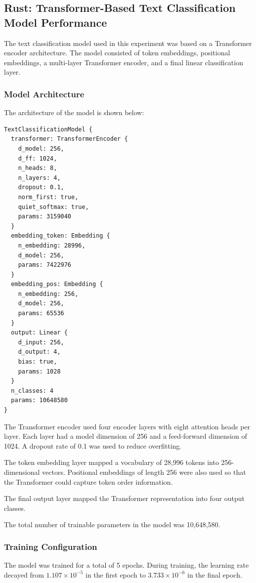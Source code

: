 \documentclass{ieeeaccess}
\begin{document}
\subsection{Rust: Transformer-Based Text Classification Model Performance}

The text classification model used in this experiment was based on a Transformer encoder architecture. The model consisted of token embeddings, positional embeddings, a multi-layer Transformer encoder, and a final linear classification layer.

\subsubsection{Model Architecture}

The architecture of the model is shown below:

\begin{lstlisting}
TextClassificationModel {
  transformer: TransformerEncoder {
    d_model: 256,
    d_ff: 1024,
    n_heads: 8,
    n_layers: 4,
    dropout: 0.1,
    norm_first: true,
    quiet_softmax: true,
    params: 3159040
  }
  embedding_token: Embedding {
    n_embedding: 28996,
    d_model: 256,
    params: 7422976
  }
  embedding_pos: Embedding {
    n_embedding: 256,
    d_model: 256,
    params: 65536
  }
  output: Linear {
    d_input: 256,
    d_output: 4,
    bias: true,
    params: 1028
  }
  n_classes: 4
  params: 10648580
}
\end{lstlisting}

The Transformer encoder used four encoder layers with eight attention heads per layer. Each layer had a model dimension of 256 and a feed-forward dimension of 1024. A dropout rate of 0.1 was used to reduce overfitting.

The token embedding layer mapped a vocabulary of 28,996 tokens into 256-dimensional vectors. Positional embeddings of length 256 were also used so that the Transformer could capture token order information.

The final output layer mapped the Transformer representation into four output classes.

The total number of trainable parameters in the model was 10,648,580.

\subsubsection{Training Configuration}

The model was trained for a total of 5 epochs. During training, the learning rate decayed from $1.107 \times 10^{-5}$ in the first epoch to $3.733 \times 10^{-6}$ in the final epoch.
\end{document}
